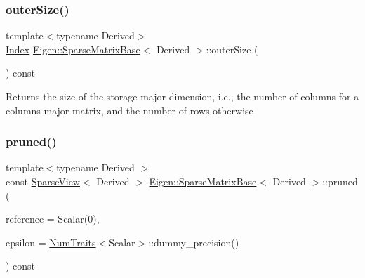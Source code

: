 \subsubsection{\texorpdfstring{outerSize()}{outerSize()}}
{\footnotesize\ttfamily template$<$typename Derived$>$ \\
\mbox{\hyperlink{struct_eigen_1_1_eigen_base_a554f30542cc2316add4b1ea0a492ff02}{Index}} \mbox{\hyperlink{class_eigen_1_1_sparse_matrix_base}{Eigen\+::\+Sparse\+Matrix\+Base}}$<$ Derived $>$\+::outer\+Size (\begin{DoxyParamCaption}{ }\end{DoxyParamCaption}) const\hspace{0.3cm}{\ttfamily [inline]}}

\begin{DoxyReturn}{Returns}
the size of the storage major dimension, i.\+e., the number of columns for a columns major matrix, and the number of rows otherwise 
\end{DoxyReturn}
\mbox{\label{class_eigen_1_1_sparse_matrix_base_ac8d0414b56d9d620ce9a698c1b281e5d}} 
\subsubsection{\texorpdfstring{pruned()}{pruned()}}
{\footnotesize\ttfamily template$<$typename Derived $>$ \\
const \mbox{\hyperlink{class_eigen_1_1_sparse_view}{Sparse\+View}}$<$ Derived $>$ \mbox{\hyperlink{class_eigen_1_1_sparse_matrix_base}{Eigen\+::\+Sparse\+Matrix\+Base}}$<$ Derived $>$\+::pruned (\begin{DoxyParamCaption}\item[{const Scalar \&}]{reference = {\ttfamily Scalar(0)},  }\item[{const \mbox{\hyperlink{class_eigen_1_1_sparse_matrix_base_aaec8ace6efb785c81d442931c3248d88}{Real\+Scalar}} \&}]{epsilon = {\ttfamily \mbox{\hyperlink{struct_eigen_1_1_num_traits}{Num\+Traits}}$<$Scalar$>$\+:\+:dummy\+\_\+precision()} }\end{DoxyParamCaption}) const\hspace{0.3cm}{\ttfamily [inline]}}

